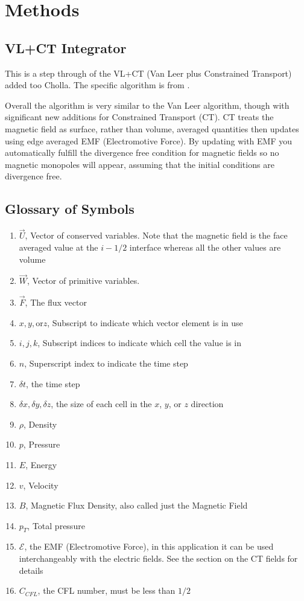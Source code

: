 \section{Methods}
\label{sec:methods}

\subsection{VL+CT Integrator}

This is a step through of the VL+CT (Van Leer plus Constrained Transport) added too Cholla. The specific algorithm is from \citeyear[Stone \& Gardiner][]{stone_2009}.

Overall the algorithm is very similar to the Van Leer algorithm, though with significant new additions for Constrained Transport (CT). CT treats the magnetic field as surface, rather than volume, averaged quantities then updates using edge averaged EMF (Electromotive Force). By updating with EMF you automatically fulfill the divergence free condition for magnetic fields so no magnetic monopoles will appear, assuming that the initial conditions are divergence free.

\subsection*{Glossary of Symbols}

\begin{enumerate}
    \item $ \vec{U} $, Vector of conserved variables. Note that the magnetic field is the face averaged value at the $ i-1/2 $ interface whereas all the other values are volume
    \item $ \vec{W} $, Vector of primitive variables.
    \item $ \vec{F} $, The flux vector
    \item $ x, y, \text{or} z $, Subscript to indicate which vector element is in use
    \item $ i, j, k $, Subscript indices to indicate which cell the value is in
    \item $ n $, Superscript index to indicate the time step
    \item $ \delta t $, the time step
    \item $ \delta x, \delta y, \delta z $, the size of each cell in the $x$, $y$, or $z$ direction
    \item $\rho  $, Density
    \item $p  $, Pressure
    \item $E $, Energy
    \item $v  $, Velocity
    \item $B $, Magnetic Flux Density, also called just the Magnetic Field
    \item $p_T $, Total pressure
    \item $ \mathcal{E} $, the EMF (Electromotive Force), in this application it can be used interchangeably with the electric fields. See the section on the CT fields for details
    \item $ C_{CFL} $, the CFL number, must be less than $1/2$
\end{enumerate}

